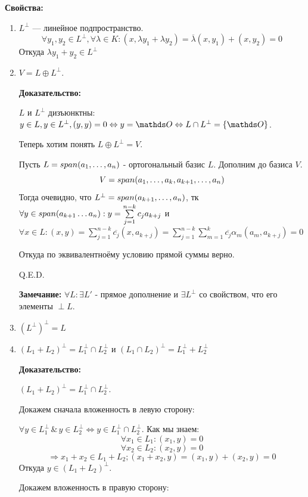 \textbf{Свойства:}
\begin{enumerate}
    \item $L^{\perp}$ --- линейное подпространство. 
    $$\forall y_1,y_2 \in L^{\perp}, \forall \lambda \in K: (x,\lambda y_1 + \lambda y_2) = \overline{\lambda} (x,y_1) + (x,y_2) = 0$$
    Откуда $\lambda y_1  + y_2 \in L^{\perp}$

    \item $V = L \oplus L^{\perp}$. 
    

    \textbf{Доказательство:}

    $L$ и $L^\perp$ дизъюнктны: $y\in L, y \in L^\perp, (y,y) = 0 \Leftrightarrow y =\zero \Leftrightarrow L \cap L^\perp = \{\zero\}$. 
    
     Теперь хотим понять $L \oplus L^{\perp} = V$. 
     
     Пусть $L = span (a_1,\ldots,a_n)$ - ортогональный базис $L$. Дополним до базиса $V$. $$V = span(a_1,\ldots,a_k,a_{k+1},\ldots, a_n)$$
    Тогда очевидно, что $L^\perp = span (a_{k+1}, \ldots,a_n)$, тк $\forall y \in span(a_{k+1}\ldots a_n):y = \sum\limits_{j=1}^{n-k} c_j a_{k+j}$ и $\forall x\in L: (x,y) = \sum\limits_{j=1}^{n-k}\overline{c_j}(x, a_{k+j}) = \sum\limits_{j=1}^{n-k}\sum\limits_{m=1}^k \overline{c_j}\alpha_m (a_m,a_{k+j})=0$

    Откуда по эквивалентноёму условию прямой суммы верно.

    \hfill Q.E.D.

    \textbf{Замечание:} $\forall L: \exists L'$ - прямое дополнение и $\exists L^{\perp}$ со свойством, что его элементы $\perp L$. 

 \item $(L^\perp)^\perp  = L$
 
    \item $(L_1+L_2)^\perp = L_1^\perp \cap L_2^\perp$ и $(L_1 \cap L_2)^\perp = L_1^{\perp}+ L_2^{\perp}$

    \textbf{Доказательство:}

    $(L_1+L_2)^{\perp} = L_1^{\perp} \cap L_2^{\perp}$.

    Докажем сначала вложенность в левую сторону:

    $\forall  y \in L_1^\perp \, \&\, y\in L_2^\perp \Leftrightarrow y\in L_1^\perp \cap L_2^\perp$. Как мы знаем:
    $$\forall x_1 \in L_1: (x_1,y)=0$$
    $$\forall x_2 \in L_2: (x_2,y)=0$$
    $$\Rightarrow x_1 + x_2 \in L_1 + L_2; (x_1 + x_2, y) = (x_1,y) + (x_2,y)=0$$
    Откуда $y\in (L_1+L_2)^\perp$.

    Докажем вложенность в правую сторону:


\end{enumerate}
